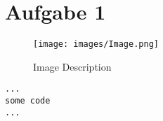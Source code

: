 \documentclass[12pt]{article}
\begin{document}
\maketitle


%
%
\section{Aufgabe 1}

\begin{figure}[H]
\centering
\texttt{[image: images/Image.png]}
\caption{Image Description}
\end{figure}

\begin{lstlisting}[caption=Ausschnitt ViewController mit InterfaceBuilder-Outlets]
...
some code
...
\end{lstlisting}
\end{document}
